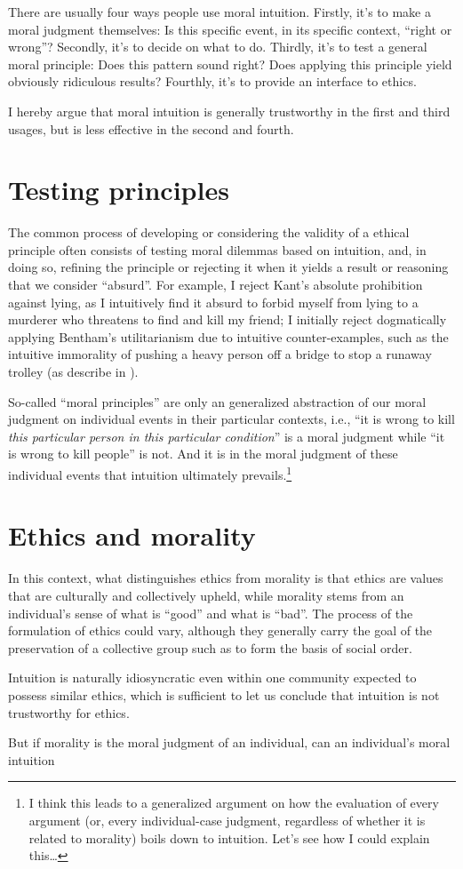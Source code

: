 \documentclass{scrartcl}
\begin{document}
There are usually four ways people use moral intuition. Firstly, it's to make a moral judgment themselves: Is this specific event, in its specific context, ``right or wrong''? Secondly, it's to decide on what to do. Thirdly, it's to test a general moral principle: Does this pattern sound right? Does applying this principle yield obviously ridiculous results? Fourthly, it's to provide an interface to ethics.

I hereby argue that moral intuition is generally trustworthy in the first and third usages, but is less effective in the second and fourth.

\section{Testing principles}

The common process of developing or considering the validity of a ethical principle often consists of testing moral dilemmas based on intuition, and, in doing so, refining the principle or rejecting it when it yields a result or reasoning that we consider ``absurd''. For example, I reject Kant's absolute prohibition against lying, as I intuitively find it absurd to forbid myself from lying to a murderer who threatens to find and kill my friend; I initially reject dogmatically applying Bentham's utilitarianism due to intuitive counter-examples, such as the intuitive immorality of pushing a heavy person off a bridge to stop a runaway trolley (as describe in \autocite[21]{justice}).

So-called ``moral principles'' are only an generalized abstraction of our moral judgment on individual events in their particular contexts, i.e., ``it is wrong to kill \emph{this particular person in this particular condition}'' is a moral judgment while ``it is wrong to kill people'' is not. And it is in the moral judgment of these individual events that intuition ultimately prevails.\footnote{I think this leads to a generalized argument on how the evaluation of every argument (or, every individual-case judgment, regardless of whether it is related to morality) boils down to intuition. Let's see how I could explain this\ldots{}}
 
\section{Ethics and morality}

In this context, what distinguishes ethics from morality is that ethics are values that are culturally and collectively upheld, while morality stems from an individual's sense of what is ``good'' and what is ``bad''. The process of the formulation of ethics could vary, although they generally carry the goal of the preservation of a collective group such as to form the basis of social order.

Intuition is naturally idiosyncratic even within one community expected to possess similar ethics, which is sufficient to let us conclude that intuition is not trustworthy for ethics.

But if morality is the moral judgment of an individual, can an individual's moral intuition

\printbibliography
\end{document}
